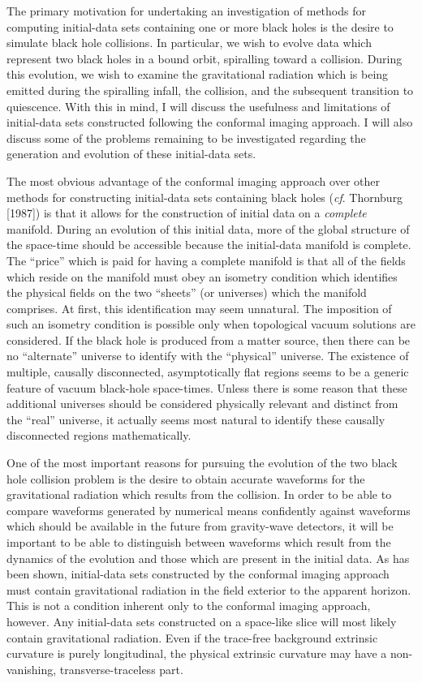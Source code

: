 The primary motivation for undertaking an investigation of methods for computing
initial-data sets containing one or more black holes is the desire to simulate
black hole collisions.  In particular, we wish to evolve  data which represent
two black holes in a bound orbit, spiralling toward a collision.  During this
evolution, we wish to examine the gravitational radiation which is being emitted
during the spiralling infall, the collision, and the subsequent transition to
quiescence.  With this in mind, I will discuss the usefulness and limitations of
initial-data sets constructed following the conformal imaging approach.  I will
also discuss some of the problems remaining to be investigated regarding the
generation and evolution of these initial-data sets.

The most obvious advantage of the conformal imaging approach over other methods
for constructing initial-data sets containing black holes ({\it cf}. Thornburg
[1987]) is that it allows for the construction of initial data on a {\it
complete} manifold.  During an evolution of this initial data, more of the
global structure of the space-time should be accessible because the initial-data
manifold is complete.  The ``price'' which is paid for having a complete
manifold is that all of the fields which reside on the manifold must obey an
isometry condition which identifies the physical fields on the two ``sheets''
(or universes) which the manifold comprises.  At first, this identification may
seem unnatural.  The imposition of such an isometry condition is possible only
when topological vacuum solutions are considered.  If the black hole is produced
from a matter source, then there can be no ``alternate'' universe to identify
with the ``physical'' universe.  The existence of multiple, causally
disconnected, asymptotically flat regions seems to be a generic feature of
vacuum black-hole space-times.  Unless there is some reason that these
additional universes should be considered physically relevant and distinct from
the ``real'' universe, it actually seems most natural to identify
these causally disconnected regions mathematically.

One of the most important reasons for pursuing the evolution of the two black
hole collision problem is the desire to obtain accurate waveforms for the
gravitational radiation which results from the collision.  In order to be able
to compare waveforms generated by numerical means confidently against waveforms
which should be available in the future from gravity-wave detectors, it will be
important to be able to distinguish between waveforms which result from the
dynamics of the evolution and those which are present in the initial data.  As
has been shown, initial-data sets constructed by the conformal imaging approach
must contain gravitational radiation in the field exterior to the apparent
horizon.  This is not a condition inherent only to the conformal imaging
approach, however.  Any initial-data sets constructed on a space-like slice will
most likely contain gravitational radiation.  Even if the trace-free background
extrinsic curvature is purely longitudinal, the physical extrinsic curvature may
have a non-vanishing, transverse-traceless part.

